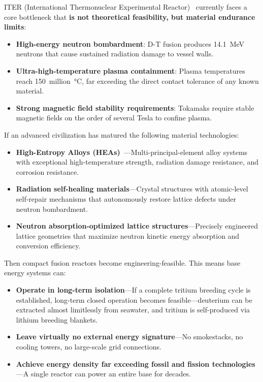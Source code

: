 \documentclass[aps,prd,twocolumn,superscriptaddress,nofootinbib]{revtex4-2}
\begin{document}
ITER (International Thermonuclear Experimental Reactor)~\cite{ITER} currently faces a core bottleneck that \textbf{is not theoretical feasibility, but material endurance limits}:

\begin{itemize}
  \item \textbf{High-energy neutron bombardment}: D-T fusion produces \SI{14.1}{MeV} neutrons that cause sustained radiation damage to vessel walls.
  \item \textbf{Ultra-high-temperature plasma containment}: Plasma temperatures reach \SI{150}{million\degreeCelsius}, far exceeding the direct contact tolerance of any known material.
  \item \textbf{Strong magnetic field stability requirements}: Tokamaks require stable magnetic fields on the order of several Tesla to confine plasma.
\end{itemize}

If an advanced civilization has matured the following material technologies:

\begin{itemize}
  \item \textbf{High-Entropy Alloys (HEAs)}~\cite{Miracle2017}---Multi-principal-element alloy systems with exceptional high-temperature strength, radiation damage resistance, and corrosion resistance.
  \item \textbf{Radiation self-healing materials}---Crystal structures with atomic-level self-repair mechanisms that autonomously restore lattice defects under neutron bombardment.
  \item \textbf{Neutron absorption-optimized lattice structures}---Precisely engineered lattice geometries that maximize neutron kinetic energy absorption and conversion efficiency.
\end{itemize}

Then compact fusion reactors become engineering-feasible. This means base energy systems can:

\begin{itemize}
  \item \textbf{Operate in long-term isolation}---If a complete tritium breeding cycle is established, long-term closed operation becomes feasible---deuterium can be extracted almost limitlessly from seawater, and tritium is self-produced via lithium breeding blankets.
  \item \textbf{Leave virtually no external energy signature}---No smokestacks, no cooling towers, no large-scale grid connections.
  \item \textbf{Achieve energy density far exceeding fossil and fission technologies}---A single reactor can power an entire base for decades.
\end{itemize}
\end{document}
